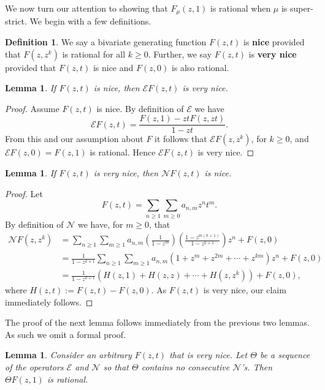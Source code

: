 \documentclass{article}
\theoremstyle{plain}
\newtheorem{lemma}[theorem]{Lemma}
\theoremstyle{definition}
\newtheorem{definition}[theorem]{Definition}
\newcommand{\N}{\mathcal{N}}
\newcommand{\E}{\mathcal{E}}
\begin{document}
We now turn our attention to showing that $F_\mu(z,1)$ is rational when $\mu$ is super-strict. We begin with a few definitions.

\begin{definition}
We say a bivariate generating function $F(z,t)$ is \textbf{nice} provided that $F(z,z^k)$ is rational for all $k\geq 0$.  Further, we say $F(z,t)$ is \textbf{very nice} provided that $F(z,t)$ is nice and $F(z,0)$ is also rational.  
\end{definition}



\begin{lemma}\label{lem:rho}
If $F(z,t)$ is nice, then $\E F(z,t)$ is very nice.  
\end{lemma}
\begin{proof}
Assume $F(z,t)$ is nice.  By definition of $\E$ we have 
$$ \E F(z,t) = \frac{F(z,1)-ztF(z,zt)}{1-zt}.$$
From this and our assumption about $F$ it follows that $\E F(z,z^k)$, for $k\geq 0$, and $\E F(z,0) = F(z,1)$ is rational. Hence $\E F(z,t)$ is very nice. 
\end{proof}

\begin{lemma}\label{lem:upsilon}
If $F(z,t)$ is very nice, then $\N F(z,t)$ is nice.  
\end{lemma}

\begin{proof}
Let
$$F(z,t) = \sum_{n\geq 1}\sum_{m\geq 0} a_{n,m} z^nt^m.$$
By definition of $\N$ we have, for $m\geq 0$, that
\begin{align*}
\N F(z,z^k) &= \sum_{n\geq 1}\sum_{m\geq 1} a_{n,m} \left(\frac{1}{1-z^m}\right)\left(\frac{1-z^{m(k+1)}}{1-z^{k+1}}\right)z^n + F(z,0)\\
&=\frac{1}{1-z^{k+1}} \sum_{n\geq 1}\sum_{m\geq 1} a_{n,m} (1+z^m + z^{2m} + \cdots + z^{km})z^n + F(z,0)\\
&= \frac{1}{1-z^{k+1}} \left(H(z,1) +H(z,z)+ \cdots+ H(z,z^k)\right)  + F(z,0),
\end{align*}
where $H(z,t):= F(z,t) - F(z,0)$.  
As $F(z,t)$ is very nice, our claim immediately follows.  
\end{proof}
 

The proof of the next lemma follows immediately from the previous two lemmas.  As such we omit a formal proof.   
\begin{lemma}\label{lem:no consecutive N's}
Consider an arbitrary $F(z,t)$ that is very nice.  Let $\Theta$ be a sequence of the operators $\E$ and $\N$ so that $\Theta$ contains no consecutive $\N$'s.  Then 
$\Theta F(z,1)$ is rational.  
\end{lemma}
\end{document}

